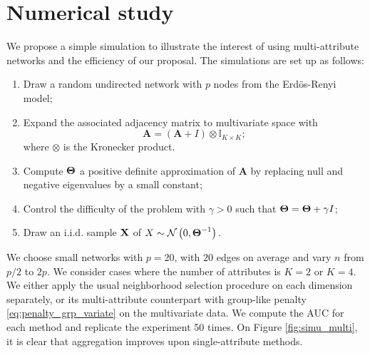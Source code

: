 \section{Numerical  study}

We propose a simple simulation to illustrate the interest of using
multi-attribute networks and the efficiency of our proposal.  The
simulations are set up as follows:
\begin{enumerate}
\item  Draw  a random  undirected  network  with  $p$ nodes  from  the
  Erdös-Renyi model;
\item  Expand the  associated adjacency  matrix to  multivariate space
  with
  $$\mathbf{A}=(\mathbf{A} + I) \otimes \mathbb{I}_{K\times K};$$
  where $\otimes$ is the Kronecker product.
\item Compute $\boldsymbol\Theta$ a positive definite approximation of
  $\mathbf{A}$ by replacing null and negative eigenvalues by a small constant;
\item Control the difficulty of  the problem with $\gamma>0$ such that
  $\boldsymbol\Theta= \boldsymbol\Theta+ \gamma I$;
\item  Draw  an i.i.d.   sample  $\mathbf{X}$  of $X  \sim  \mathcal{N} \left( 0,\boldsymbol\Theta^{-1} \right) .$
\end{enumerate}
We choose small  networks with $p=20$, with $20$ edges  on average and
vary $n$  from $p/2$ to  $2p$. We consider  cases where the  number of
attributes is $K=2$ or $K=4$.   We either apply the usual neighborhood
selection   procedure   on   each   dimension   separately,   or   its
multi-attribute      counterpart      with     group-like      penalty
\eqref{eq:penalty_grp_variate} on  the multivariate data.   We compute
the AUC  for each  method and  replicate the  experiment 50  times. On
Figure  \ref{fig:simu_multi}, it  is clear  that aggregation  improves
upon single-attribute methods.
